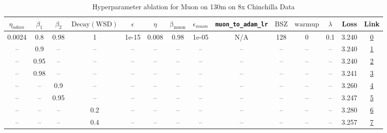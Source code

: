 \begin{table}[H]
\centering
\caption{Hyperparameter ablation for Muon on 130m on 8x Chinchilla Data}
\label{tab:ablation_muon_130m_8}
\begin{tabular}{cccccccccccccc}
\toprule
$\eta_{adam}$ & $\beta_1$ & $\beta_2$ & $\mathrm{Decay (WSD)}$ & $\epsilon$ & $\eta$ & $\mathrm{\beta_{muon}}$ & $\epsilon_{muon}$ & \texttt{muon\_to\_adam\_lr} & $\mathrm{BSZ}$ & $\mathrm{warmup}$ & $\lambda$ & Loss & Link \\
\midrule
0.0024 & 0.8 & 0.98 & 1 & 1e-15 & 0.008 & 0.98 & 1e-05 & N/A & 128 & 0 & 0.1 & 3.240 & \href{https://wandb.ai/stanford-mercury/optimizer-scaling/runs/sweep-130m-21B-muon9841d7lr0.008-wd0.1-minlr0-warmup0-b10.8-b20.-6269f2}{0} \\
\midrule
-- & 0.9 & -- & -- & -- & -- & -- & -- & -- & -- & -- & -- & 3.240 & \href{https://wandb.ai/stanford-mercury/optimizer-scaling/runs/sweep-130m-21B-muon84cfa5lr0.008-wd0.1-minlr0-warmup0-b10.9-b20.-e91d3e}{1} \\
-- & 0.95 & -- & -- & -- & -- & -- & -- & -- & -- & -- & -- & 3.240 & \href{https://wandb.ai/stanford-mercury/optimizer-scaling/runs/sweep-130m-21B-muon0df321lr0.008-wd0.1-minlr0-warmup0-b10.95-b20-df585f}{2} \\
-- & 0.98 & -- & -- & -- & -- & -- & -- & -- & -- & -- & -- & 3.241 & \href{https://wandb.ai/stanford-mercury/optimizer-scaling/runs/sweep-130m-21B-muonfd2768lr0.008-wd0.1-minlr0-warmup0-b10.98-b20-ee9b19}{3} \\
-- & -- & 0.9 & -- & -- & -- & -- & -- & -- & -- & -- & -- & 3.260 & \href{https://wandb.ai/stanford-mercury/optimizer-scaling/runs/sweep-130m-21B-muon6d8811lr0.008-wd0.1-minlr0-warmup0-b10.8-b20.-2cfe0a}{4} \\
-- & -- & 0.95 & -- & -- & -- & -- & -- & -- & -- & -- & -- & 3.247 & \href{https://wandb.ai/stanford-mercury/optimizer-scaling/runs/sweep-130m-21B-muon8b9bb9lr0.008-wd0.1-minlr0-warmup0-b10.8-b20.-74bf2d}{5} \\
-- & -- & -- & 0.2 & -- & -- & -- & -- & -- & -- & -- & -- & 3.280 & \href{https://wandb.ai/stanford-mercury/optimizer-scaling/runs/sweep-130m-21B-muon4353c9lr0.008-wd0.1-minlr0-warmup0-b10.8-b20.-66d626}{6} \\
-- & -- & -- & 0.4 & -- & -- & -- & -- & -- & -- & -- & -- & 3.257 & \href{https://wandb.ai/stanford-mercury/optimizer-scaling/runs/sweep-130m-21B-muon019394lr0.008-wd0.1-minlr0-warmup0-b10.8-b20.-d9267d}{7} \\

\end{tabular}
\end{table}
